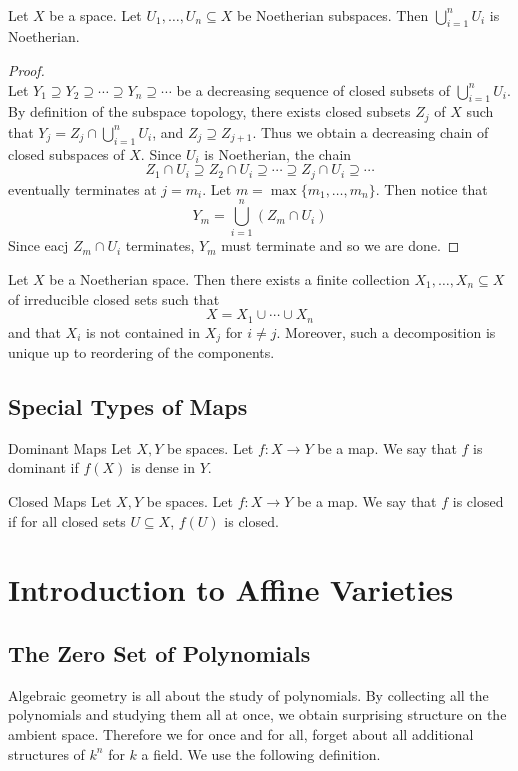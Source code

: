 \documentclass[a4paper]{article}
\begin{document}
\begin{prp}{}{}\\
Let $X$ be a space. Let $U_1,\dots,U_n\subseteq X$ be Noetherian subspaces. Then $\bigcup_{i=1}^nU_i$ is Noetherian. 
\begin{proof}\\
Let $Y_1\supseteq Y_2\supseteq\cdots\supseteq Y_n\supseteq\cdots$ be a decreasing sequence of closed subsets of $\bigcup_{i=1}^nU_i$. By definition of the subspace topology, there exists closed subsets $Z_j$ of $X$ such that $Y_j=Z_j\cap\bigcup_{i=1}^nU_i$, and $Z_j\supseteq Z_{j+1}$. Thus we obtain a decreasing chain of closed subspaces of $X$. Since $U_i$ is Noetherian, the chain $$Z_1\cap U_i\supseteq Z_2\cap U_i\supseteq\cdots\supseteq Z_j\cap U_i\supseteq\cdots$$ eventually terminates at $j=m_i$. Let $m=\max\{m_1,\dots,m_n\}$. Then notice that $$Y_m=\bigcup_{i=1}^n(Z_m\cap U_i)$$ Since eacj $Z_m\cap U_i$ terminates, $Y_m$ must terminate and so we are done. 
\end{proof}
\end{prp}

\begin{prp}{}{} Let $X$ be a Noetherian space. Then there exists a finite collection $X_1,\dots,X_n\subseteq X$ of irreducible closed sets such that $$X=X_1\cup\cdots\cup X_n$$ and that $X_i$ is not contained in $X_j$ for $i\neq j$. Moreover, such a decomposition is unique up to reordering of the components. 
\end{prp}

\subsection{Special Types of Maps}
\begin{defn}{Dominant Maps}{} Let $X,Y$ be spaces. Let $f:X\to Y$ be a map. We say that $f$ is dominant if $f(X)$ is dense in $Y$. 
\end{defn}

\begin{defn}{Closed Maps}{} Let $X,Y$ be spaces. Let $f:X\to Y$ be a map. We say that $f$ is closed if for all closed sets $U\subseteq X$, $f(U)$ is closed. 
\end{defn}

\pagebreak
\section{Introduction to Affine Varieties}
\subsection{The Zero Set of Polynomials}
Algebraic geometry is all about the study of polynomials. By collecting all the polynomials and studying them all at once, we obtain surprising structure on the ambient space. Therefore we for once and for all, forget about all additional structures of $k^n$ for $k$ a field. We use the following definition. 
\end{document}
